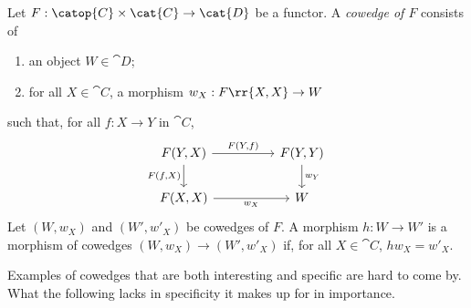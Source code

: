 \begin{definition}\label{def:cowedge}
  Let $F:\catop{C}\times\cat{C}\to\cat{D}$ be a functor. A \emph{cowedge of $F$} consists of
  \begin{enumerate}
    \item an object $W\in\cat{D}$;
    \item for all $X\in\cat{C}$, a morphism $w_X:F\rr{X,X}\to W$
  \end{enumerate}
  such that, for all $f:X\to Y$ in $\cat{C}$,
  \begin{equation}\label{eq:cowedge_property}
    \begin{tikzcd}
      {F(Y,X)} && {F(Y,Y)} \\
      {F(X,X)} && W
      \arrow["{w_X}"', from=2-1, to=2-3]
      \arrow["{w_Y}", from=1-3, to=2-3]
      \arrow["{F(Y,f)}", from=1-1, to=1-3]
      \arrow["{F(f,X)}"', from=1-1, to=2-1]
    \end{tikzcd}
  \end{equation}
  Let $(W,w_X)$ and $(W',w'_X)$ be cowedges of $F$. A morphism $h:W\to W'$ is a morphism of
  cowedges $(W,w_X)\to(W',w'_X)$ if, for all $X\in\cat{C}$, $hw_X=w'_X$.
\end{definition}

Examples of cowedges that are both interesting and specific are hard to come by.
What the following lacks in specificity it makes up for in importance.

